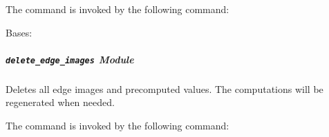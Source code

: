 \documentclass[letterpaper,10pt,english]{sphinxmanual}
\begin{document}
The command is invoked by the following command: 

\begin{fulllineitems}
\label{Contour.contour.management.commands:Contour.contour.management.commands.cleanup.Command}
Bases: 

\begin{fulllineitems}
\label{Contour.contour.management.commands:Contour.contour.management.commands.cleanup.Command.handle}
\end{fulllineitems}


\begin{fulllineitems}
\label{Contour.contour.management.commands:Contour.contour.management.commands.cleanup.Command.help}
\end{fulllineitems}


\end{fulllineitems}



\subparagraph{\texttt{delete\_edge\_images} Module}
\label{Contour.contour.management.commands:delete-edge-images-module}\label{Contour.contour.management.commands:module-Contour.contour.management.commands.delete_edge_images}
Deletes all edge images and precomputed values. The computations will be regenerated when needed.

The command is invoked by the following command: 
\end{document}
